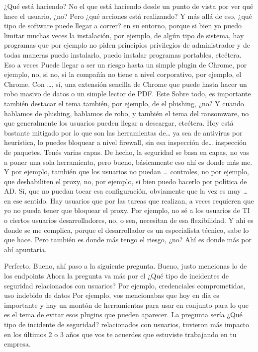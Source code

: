 \begin{description}[leftmargin=0cm, labelsep=0.5cm]
    \item[\textbf{PEÑA ALEJANDRO FRANCISCO:}] ¿Qué está haciendo? No el que está haciendo desde un punto de vista por ver qué hace el usuario, ¿no? Pero ¿qué acciones está realizando? Y más allá de eso, ¿qué tipo de software puede llegar a correr? en su entorno, porque si bien yo puedo limitar muchas veces la instalación, por ejemplo, de algún tipo de sistema, hay programas que por ejemplo no piden principios privilegios de administrador y de todas maneras puedo instalarlo, puedo instalar programas portables, etcétera. Eso a veces Puede llegar a ser un riesgo hasta un simple plugin de Chrome, por ejemplo, no, si no, si la compañía no tiene a nivel corporativo, por ejemplo, el Chrome. Con …, sí, una extensión sencilla de Chrome que puede hasta hacer un robo masivo de datos o un simple lector de PDF. Este Sobre todo, es importante también destacar el tema también, por ejemplo, de el phishing, ¿no? Y cuando hablamos de phishing, hablamos de robo, y también el tema del ransomware, no que generalmente los usuarios pueden llegar a descargar, etcétera. Hoy está bastante mitigado por lo que son las herramientas de… ya sea de antivirus por heurística, lo puedes bloquear a nivel firewall, sin esa inspección de… inspección de paquetes. Tenés varias capas. De hecho, la seguridad se basa en capas, no vas a poner una sola herramienta, pero bueno, básicamente eso ahí es donde más me. Y por ejemplo, también que los usuarios no puedan … controles, no por ejemplo, que deshabiliten el proxy, no, por ejemplo, si bien puedo hacerlo por política de AD. Sí, que no puedan tocar esa configuración, obviamente que la vez es muy … en ese sentido. Hay usuarios que por las tareas que realizan, a veces requieren que yo no pueda tener que bloquear el proxy. Por ejemplo, no sé a los usuarios de TI o ciertos usuarios desarrolladores, no, o sea, necesitan de esa flexibilidad. Y ahí es donde se me complica, porque el desarrollador es un especialista técnico, sabe lo que hace. Pero también es donde más tengo el riesgo, ¿no? Ahí es donde más por ahí apuntaría.

    \item[\textbf{MUNTAABSKI FEDERICO:}] Perfecto. Bueno, ahí paso a la siguiente pregunta. Bueno, justo mencionas lo de los endpoints Ahora la pregunta va más por el ¿Qué tipo de incidentes de seguridad relacionados con usuarios? Por ejemplo, credenciales comprometidas, uso indebido de datos Por ejemplo, vos mencionabas que hoy en día es importante y hay un montón de herramientas para usar en conjunto para lo que es el tema de evitar esos plugins que pueden aparecer. La pregunta sería ¿Qué tipo de incidente de seguridad? relacionados con usuarios, tuvieron más impacto en los últimos 2 o 3 años que vos te acuerdes que estuviste trabajando en tu empresa.


\end{description}
